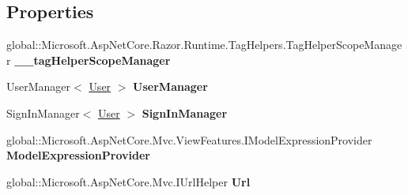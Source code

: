 \subsection*{Properties}
\begin{DoxyCompactItemize}
\item 
\mbox{\label{class_asp_net_core_1_1_views___shared____sidebar_a91e1170974975a29b809bb6475370b3e}} 
global\+::\+Microsoft.\+Asp\+Net\+Core.\+Razor.\+Runtime.\+Tag\+Helpers.\+Tag\+Helper\+Scope\+Manager {\bfseries \+\_\+\+\_\+tag\+Helper\+Scope\+Manager}
\item 
\mbox{\label{class_asp_net_core_1_1_views___shared____sidebar_a8cde35bddacf38a0ffabbd1d448f3f3c}} 
User\+Manager$<$ \mbox{\hyperlink{class_projeto_e_s_w_1_1_models_1_1_user}{User}} $>$ {\bfseries User\+Manager}
\item 
\mbox{\label{class_asp_net_core_1_1_views___shared____sidebar_a57bc28cbbf5abd2e4e349a7c9137f377}} 
Sign\+In\+Manager$<$ \mbox{\hyperlink{class_projeto_e_s_w_1_1_models_1_1_user}{User}} $>$ {\bfseries Sign\+In\+Manager}
\item 
\mbox{\label{class_asp_net_core_1_1_views___shared____sidebar_a19b657805ecb5ad9f404efde0b44a4e4}} 
global\+::\+Microsoft.\+Asp\+Net\+Core.\+Mvc.\+View\+Features.\+I\+Model\+Expression\+Provider {\bfseries Model\+Expression\+Provider}
\item 
\mbox{\label{class_asp_net_core_1_1_views___shared____sidebar_a6d1ca4b1001e8d4c99bf79953b8cd407}} 
global\+::\+Microsoft.\+Asp\+Net\+Core.\+Mvc.\+I\+Url\+Helper {\bfseries Url}
\item 
\mbox{\label{class_asp_net_core_1_1_views___shared____sidebar_adf853191115250e44e522c1254d1f547}} 

\end{DoxyCompactItemize}
